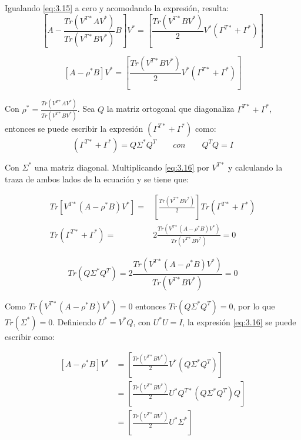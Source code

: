 Igualando \ref{eq:3.15} a cero y acomodando la expresión, resulta:
\begin{equation*}
\left[A-\frac{Tr(V^{T*} A V^*)}{Tr(V^{T*} B V^*)}B\right] V^*  = \left[\frac{Tr(V^{T*} B V^*)}{2}V^* (\Gamma^{T*} + \Gamma^{*})\right]
\end{equation*}

\begin{equation}\label{eq:3.16}
\left[ A-\rho^* B\right]V^*   = \left[ \frac{Tr(V^{T*} B V^*)}{2}V^* (\Gamma^{T*} + \Gamma^{*}) \right]
\end{equation}

Con $\rho^* = \frac{Tr(V^{T*} A V^*)}{Tr(V^{T*} B V^*)}$. Sea $Q$ la matriz ortogonal que diagonaliza $\Gamma^{T*} + \Gamma^{*}$, entonces se puede escribir la expresión $(\Gamma^{T*} + \Gamma^*)$ como:
\begin{equation*}
 \left(\Gamma^{T*} + \Gamma^{*}\right) = Q \Sigma^* Q^T \qquad con \qquad Q^TQ = I
\end{equation*}

Con $\Sigma^*$ una matriz diagonal. Multiplicando \ref{eq:3.16} por $V^{T*}$ y calculando la traza de ambos lados de la ecuación y se tiene que:

\begin{equation*}
\begin{aligned}
Tr\left[ V^{T*}(A-\rho^* B)V^*\right]  =& \left[ \frac{Tr(V^{T*} B V^*)}{2}\right] Tr(\Gamma^{T*} + \Gamma^{*}) \\
Tr(\Gamma^{T*} + \Gamma^{*}) =& 2 \frac{Tr(V^{T*}(A-\rho^*B)V^*)}{Tr(V^{T*}BV^*)} = 0
\end{aligned}
\end{equation*}





\begin{equation}\label{eq:3.17}
Tr(Q \Sigma^* Q^T) = 2 \frac{Tr(V^{T*}(A-\rho^*B)V^*)}{Tr(V^{T*}BV^*)} = 0
\end{equation}


Como $Tr(V^{T*}(A-\rho^*B)V^*) = 0$ entonces $Tr(Q \Sigma^* Q^T) =0$, por lo que $Tr(\Sigma^*) = 0$. Definiendo $U^* = V^*Q$, con $U^*U = I$, la expresión \ref{eq:3.16} se puede escribir como:

\begin{equation*}
\begin{aligned}
\left[ A-\rho^* B\right]V^*   &= \left[ \frac{Tr(V^{T*} B V^*)}{2}V^* (Q \Sigma^* Q^T) \right] \\
                              &= \left[ \frac{Tr(V^{T*} B V^*)}{2}U^*Q^{T*} (Q \Sigma^* Q^T) Q \right] \\
                              &= \left[ \frac{Tr(V^{T*} B V^*)}{2}U^* \Sigma^* \right] \\
\end{aligned}
\end{equation*}  

